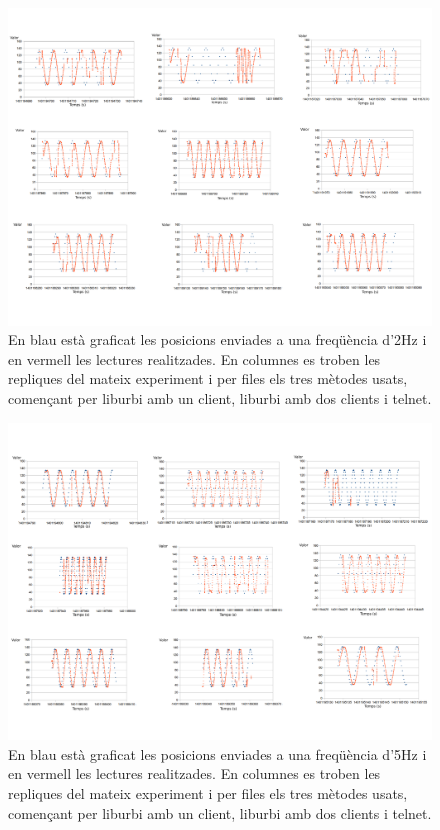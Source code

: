 \documentclass[12pt,a4paper,final,twoside]{article}
\begin{document}
\begin{figure}[H]
	\centering
    \includegraphics[scale=0.3]{images/sin2H.pdf}
	 \caption{En blau està graficat les posicions enviades a una freqüència d'2Hz i en vermell les lectures realitzades. En columnes es troben les repliques del mateix experiment i per files els tres mètodes usats, començant per liburbi amb un client, liburbi amb dos clients i telnet.}
  \label{fig:sin2H}
\end{figure}
\begin{figure}[H]
	\centering
    \includegraphics[scale=0.3]{images/sin5H.pdf}
	 \caption{En blau està graficat les posicions enviades a una freqüència d'5Hz i en vermell les lectures realitzades. En columnes es troben les repliques del mateix experiment i per files els tres mètodes usats, començant per liburbi amb un client, liburbi amb dos clients i telnet.}
  \label{fig:sin5H}
\end{figure}
\end{document}
